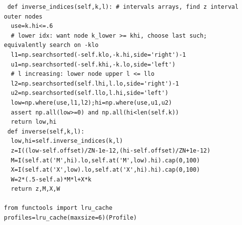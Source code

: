 \documentclass[11pt,a4paper]{article}
\numberwithin{equation}{section}
\theoremstyle{definition}
\theoremstyle{remark}
\begin{document}
\begin{lstlisting}
 def inverse_indices(self,k,l): # intervals arrays, find z interval outer nodes
  use=k.hi<=.6
  # lower idx: want node k_lower >= khi, choose last such; equivalently search on -klo
  l1=np.searchsorted(-self.klo,-k.hi,side='right')-1
  u1=np.searchsorted(-self.khi,-k.lo,side='left')
  # l increasing: lower node upper l <= llo
  l2=np.searchsorted(self.lhi,l.lo,side='right')-1
  u2=np.searchsorted(self.llo,l.hi,side='left')
  low=np.where(use,l1,l2);hi=np.where(use,u1,u2)
  assert np.all(low>=0) and np.all(hi<len(self.k))
  return low,hi
 def inverse(self,k,l):
  low,hi=self.inverse_indices(k,l)
  z=I((low-self.offset)/ZN-1e-12,(hi-self.offset)/ZN+1e-12)
  M=I(self.at('M',hi).lo,self.at('M',low).hi).cap(0,100)
  X=I(self.at('X',low).lo,self.at('X',hi).hi).cap(0,100)
  W=2*(.5-self.a)*M*l+X*k
  return z,M,X,W

from functools import lru_cache
profiles=lru_cache(maxsize=6)(Profile)


\end{lstlisting}
\end{document}

